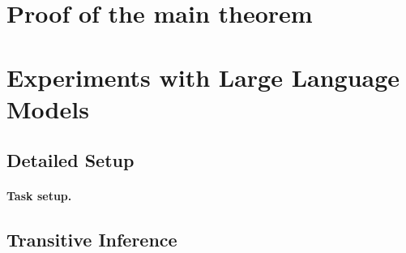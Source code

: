 \documentclass{article}
\theoremstyle{plain}
\begin{document}


\newpage
\appendix
\section{Proof of the main theorem}
\section{Experiments with Large Language Models}
\label{app:dnns}
\subsection{Detailed Setup}
\paragraph{Task setup.}
\subsection{Transitive Inference}
\end{document}
